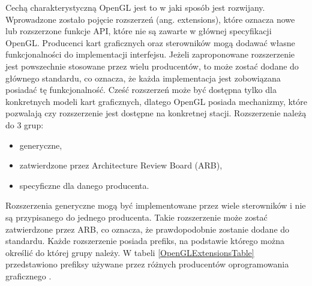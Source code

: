 \documentclass[archive]{mgr}
\begin{document}
Cechą charakterystyczną OpenGL jest to w jaki sposób jest rozwijany. Wprowadzone zostało pojęcie rozszerzeń (ang.  extensions), które oznacza nowe lub rozszerzone funkcje API, które nie są zawarte w głównej specyfikacji OpenGL. Producenci kart graficznych oraz sterowników mogą dodawać własne funkcjonalności do implementacji interfejsu. Jeżeli zaproponowane rozszerzenie jest powszechnie stosowane przez wielu producentów, to może zostać dodane do głównego standardu, co oznacza, że każda implementacja jest zobowiązana posiadać tę funkcjonalność. Cześć rozszerzeń może być dostępna tylko dla konkretnych modeli kart graficznych, dlatego OpenGL posiada mechanizmy, które pozwalają czy rozszerzenie jest dostępne na konkretnej stacji. Rozszerzenie należą do 3 grup:
\begin{itemize}
  \item generyczne,
  \item zatwierdzone przez Architecture Review Board (ARB),
  \item specyficzne dla danego producenta.
\end{itemize}
\newpage
Rozszerzenia generyczne mogą być implementowane przez wiele sterowników i nie są przypisanego do jednego producenta. Takie rozszerzenie może zostać zatwierdzone przez ARB, co oznacza, że prawdopodobnie zostanie dodane do standardu. Każde rozszerzenie posiada prefiks, na podstawie którego można określić do której grupy należy. W tabeli \ref{OpenGLExtensionsTable} przedstawiono prefiksy używane przez różnych producentów oprogramowania graficznego \cite{OpenGLExtensions}. 
\end{document}
